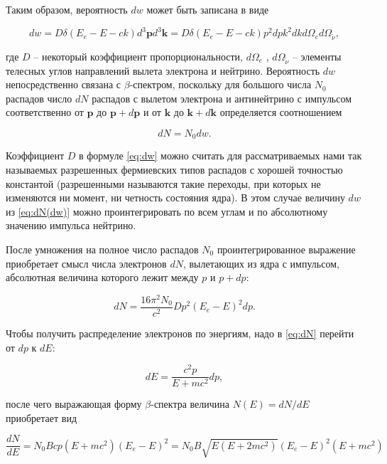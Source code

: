 \documentclass[a4paper, 12pt]{article}
\begin{document}
    Таким образом, вероятность $dw$ может быть записана в виде

    \begin{equation}
        \label{eq:dw}
        dw = D \delta (E_e - E - ck)d^3 \mathbf{p} d^3 \mathbf{k} = D \delta (E_e - E - ck)p^2dpk^2dkd{\Omega}_ed{\Omega}_{\widetilde{\nu}},
    \end{equation}

    где $D$ -- некоторый коэффициент пропорциональности, $d\Omega_e$ , $d\Omega_{\widetilde{\nu}}$ -- элементы телесных углов направлений вылета электрона и нейтрино. Вероятность $dw$ непосредственно связана с $\beta$-спектром, поскольку для большого числа $N_0$ распадов число $dN$ распадов с вылетом электрона и антинейтрино с импульсом соответственно от $\mathbf{p}$ до $\mathbf{p} + d\mathbf{p}$ и от $\mathbf{k}$ до $\mathbf{k} + d\mathbf{k}$ определяется соотношением

    \begin{equation}
        \label{eq:dN(dw)}
        dN = N_0 dw.
    \end{equation}

    Коэффициент $D$ в формуле \eqref{eq:dw} можно считать для рассматриваемых нами так называемых разрешенных фермиевских типов распадов с хорошей точностью константой (разрешенными называются такие переходы, при которых не изменяются ни момент, ни четность состояния ядра). В этом случае величину $dw$ из \eqref{eq:dN(dw)} можно проинтегрировать по всем углам и по абсолютному значению импульса нейтрино.

    После умножения на полное число распадов $N_0$ проинтегрированное выражение приобретает смысл числа электронов $dN$, вылетающих из ядра с импульсом, абсолютная величина которого лежит между $p$ и $ p + dp$:

    \begin{equation}
        \label{eq:dN}
        dN = \dfrac{16\pi^2 N_0}{c^2}Dp^2(E_e - E)^2dp.
    \end{equation}

    Чтобы получить распределение электронов по энергиям, надо в \eqref{eq:dN} перейти от $dp$ к $dE$:

    \begin{equation}
        dE = \dfrac{c^2p}{E + mc^2}dp,
    \end{equation}

    после чего выражающая форму $\beta$-спектра величина $N(E) = dN/dE$ приобретает вид

    \begin{equation}
        \label{eq:dN/dE}
        \dfrac{dN}{dE} = N_0Bcp(E + mc^2)(E_e - E)^2 = N_0B\sqrt{E(E + 2mc^2)}(E_e - E)^2(E + mc^2)
    \end{equation}
\end{document}
